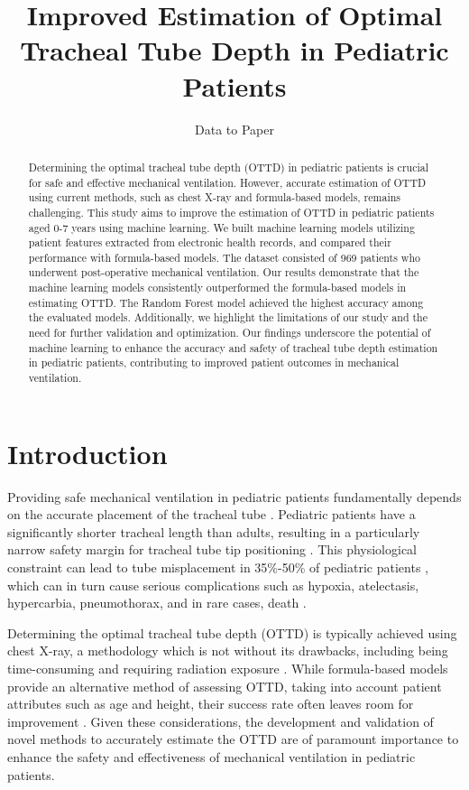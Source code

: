 \documentclass[11pt]{article}
\title{Improved Estimation of Optimal Tracheal Tube Depth in Pediatric Patients}
\author{Data to Paper}
\begin{document}
\maketitle
\begin{abstract}
Determining the optimal tracheal tube depth (OTTD) in pediatric patients is crucial for safe and effective mechanical ventilation. However, accurate estimation of OTTD using current methods, such as chest X-ray and formula-based models, remains challenging. This study aims to improve the estimation of OTTD in pediatric patients aged 0-7 years using machine learning. We built machine learning models utilizing patient features extracted from electronic health records, and compared their performance with formula-based models. The dataset consisted of 969 patients who underwent post-operative mechanical ventilation. Our results demonstrate that the machine learning models consistently outperformed the formula-based models in estimating OTTD. The Random Forest model achieved the highest accuracy among the evaluated models. Additionally, we highlight the limitations of our study and the need for further validation and optimization. Our findings underscore the potential of machine learning to enhance the accuracy and safety of tracheal tube depth estimation in pediatric patients, contributing to improved patient outcomes in mechanical ventilation.
\end{abstract}
\section*{Introduction}

Providing safe mechanical ventilation in pediatric patients fundamentally depends on the accurate placement of the tracheal tube \cite{Kendirli2006MechanicalVI}. Pediatric patients have a significantly shorter tracheal length than adults, resulting in a particularly narrow safety margin for tracheal tube tip positioning \cite{Kneyber2017RecommendationsFM}. This physiological constraint can lead to tube misplacement in 35\%-50\% of pediatric patients \cite{Kollef1994EndotrachealTM}, which can in turn cause serious complications such as hypoxia, atelectasis, hypercarbia, pneumothorax, and in rare cases, death \cite{Traiber2009ProfileAC}. 

Determining the optimal tracheal tube depth (OTTD) is typically achieved using chest X-ray, a methodology which is not without its drawbacks, including being time-consuming and requiring radiation exposure \cite{Rajajee2011RealtimeUP}. While formula-based models provide an alternative method of assessing OTTD, taking into account patient attributes such as age and height, their success rate often leaves room for improvement \cite{Mariano2005ACO, Takita2003TheHF, Foronda2011TheIO}. Given these considerations, the development and validation of novel methods to accurately estimate the OTTD are of paramount importance to enhance the safety and effectiveness of mechanical ventilation in pediatric patients. 
\end{document}
